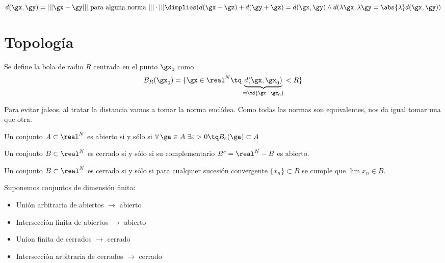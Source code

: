 \documentclass{apuntes}
\begin{document}
\begin{remark}
$d(\gx,\gy) = |||\gx-\gy||| \text{ para alguna norma }|||\cdot||| \dimplies (d(\gx+\gz)+d(\gy+\gz) = d(\gx,\gy) \wedge d(\lambda \gx,\lambda \gy = \abs{\lambda} d(\gx,\gy))$
\end{remark}

\section{Topología}
\begin{defn}[Bola] Se define la bola de radio $R$ centrada en el punto $\gx_0$ como 
\[B_R(\gx_0) =\{\gx \in \real^N \tq \underbrace{d(\gx,\gx_0)}_{=\md{\gx-\gx_0}} < R \} \]
\end{defn}


Para evitar jaleos, al tratar la distancia vamos a tomar la norma euclídea. Como todas las normas son equivalentes, nos da igual tomar una que otra.
\begin{defn} Un conjunto $A \subset \real^N$ es abierto si y sólo si $\forall\, \ga\in A\; \exists \varepsilon > 0 \tq B_\varepsilon(\ga) \subset A$
\end{defn}

\begin{defn} Un conjunto $B \subset \real^N$ es cerrado si y sólo si su complementario $B^c= \real^N-B$ es abierto.
\end{defn}

\begin{theorem} Un conjunto $B \subset \real^N$ es cerrado si y sólo si para cualquier sucesión convergente $\{x_n\} \subset B$ se cumple que  $\lim x_n \in B$. 
\end{theorem}

\begin{theorem}
Suponemos conjuntos de dimensión finita:
\begin{itemize}
 \item Unión arbitraria de abiertos $\rightarrow$ abierto
 \item Intersección finita de abiertos $\rightarrow$ abierto
 \item Union finita de cerrados $\rightarrow$ cerrado
 \item Intersección arbitraria de cerrados $\rightarrow$ cerrado
\end{itemize} 
\end{theorem}
\end{document}
